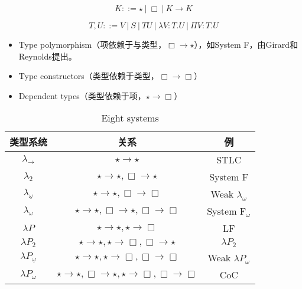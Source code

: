 $$K ::= \star \ | \ \Box \ | \ K \to K$$

$$T, U ::= V \ | \ S \ | \ T U \ | \ \lambda V : T.U \ | \ \Pi V : T.U$$

\begin{itemize}
  \item Type polymorphism（项依赖于与类型，$\Box \to \star$），如System F，由Girard和Reynolds提出。
  \item Type constructors（类型依赖于类型，$\Box \to \Box$）
  \item Dependent types（类型依赖于项，$\star \to \Box$）
\end{itemize}



\begin{table}[!htb]
\centering
\caption{Eight systems}
\begin{tabular}{|c|c|c|}
\hline
类型系统                            & 关系                                                              & 例                          \\ \hline
$\lambda_{\to}$                 & $\star \to \star$                                               & STLC                       \\ \hline
$\lambda_2$                     & $\star \to \star, \Box \to \star$                               & System F                   \\ \hline
$\lambda _{\underline \omega}$  & $\star \to \star, \Box \to \Box$                                & Weak $\lambda_{\omega}$    \\ \hline
$\lambda_{\omega}$              & $\star \to \star, \Box \to \star, \Box \to \Box$                 & System $\text{F}_{\omega}$ \\ \hline
$\lambda P$                     & $\star \to \star, \star \to \Box$                               & LF                  \\ \hline
$\lambda P_2$                   & $\star \to \star, \star \to \Box, \Box \to \star$               & $\lambda P_2$              \\ \hline
$\lambda P_{\underline \omega}$ & $\star \to \star, \star \to \Box, \Box \to \Box$                 & Weak $\lambda P_{\omega}$  \\ \hline
$\lambda P_{\omega}$            & $\star \to \star, \Box \to \star, \star \to \Box, \Box \to \Box$ & CoC                        \\ \hline
\end{tabular}
\end{table}


